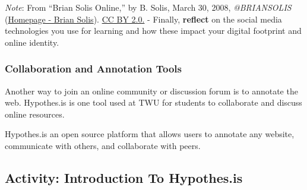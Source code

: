 \documentclass[
  letterpaper,
  DIV=11,
  numbers=noendperiod]{scrreprt}
\begin{document}
\begin{tcolorbox}
\begin{figure}[H]
\end{figure}%

\emph{Note}: From ``Brian Solis Online,'' by B. Solis, March 30, 2008,
\emph{@BRIANSOLIS} (\href{https://briansolis.com/}{Homepage - Brian
Solis}). \href{https://creativecommons.org/licenses/by/2.0/}{CC BY 2.0.}
- Finally, \textbf{reflect} on the social media technologies you use for
learning and how these impact your digital footprint and online
identity.

\end{tcolorbox}

\subsubsection{Collaboration and Annotation
Tools}\label{collaboration-and-annotation-tools}

Another way to join an online community or discussion forum is to
annotate the web. Hypothes.is is one tool used at TWU for students to
collaborate and discuss online resources.

Hypothes.is an open source platform that allows users to annotate any
website, communicate with others, and collaborate with peers.

\subsection{Activity: Introduction To
Hypothes.is}\label{activity-introduction-to-hypothes.is}
\end{document}
